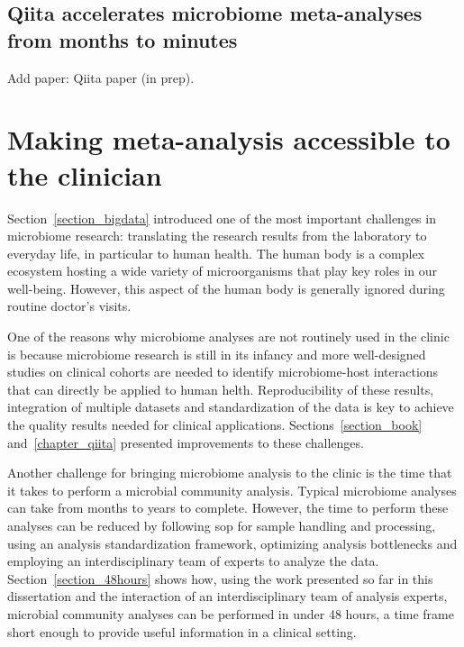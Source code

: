 \documentclass[12pt,chapterheads]{ucsd}
\begin{document}
\section{Qiita accelerates microbiome meta-analyses from months to minutes}\label{section_qiita}
Add paper: Qiita paper (in prep).

\chapter{Making meta-analysis accessible to the clinician}\label{chapter_rapid_response}
\glsresetall

Section~\ref{section_bigdata} introduced one of the most important challenges in
microbiome research: translating the research results from the laboratory to
everyday life, in particular to human health. The human body is a complex ecosystem
hosting a wide variety of microorganisms that play key roles in our well-being.
However, this aspect of the human body is generally ignored during routine
doctor's visits.

One of the reasons why microbiome analyses are not routinely used in the clinic
is because microbiome research is still in its infancy and more well-designed
studies on clinical cohorts are needed to identify microbiome-host interactions
that can directly be applied to human helth. Reproducibility of these results,
integration of multiple datasets and standardization of the data is key to achieve
the quality results needed for clinical applications. Sections~\ref{section_book}
and~\ref{chapter_qiita} presented improvements to these challenges.

Another challenge for bringing microbiome analysis to the clinic is the time that
it takes to perform a microbial community analysis. Typical microbiome
analyses can take from months to years to complete. However, the time to
perform these analyses can be reduced by following \gls{sop} for sample handling
and processing, using an analysis standardization framework, optimizing analysis
bottlenecks and employing an interdisciplinary team of experts to analyze the data.
Section~\ref{section_48hours} shows how, using the work presented so far in this
dissertation and the interaction of an interdisciplinary team of analysis experts,
microbial community analyses can be performed in under 48 hours, a time frame short
enough to provide useful information in a clinical setting.
\end{document}
